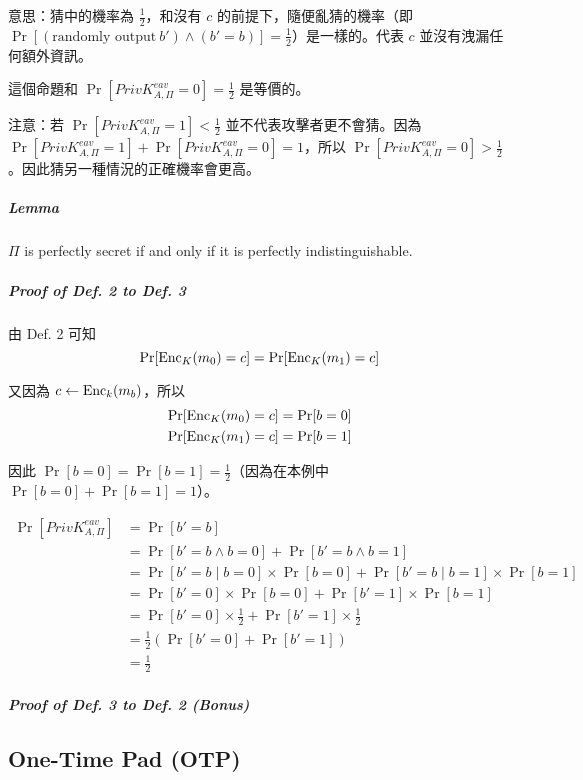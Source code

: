 意思：猜中的機率為 \(\frac{1}{2}\)，和沒有 \(c\) 的前提下，隨便亂猜的機率（即 \(\Pr[(\text{randomly output} \ b' ) \wedge (b' = b)] = \frac{1}{2}\)）是一樣的。代表 \(c\) 並沒有洩漏任何額外資訊。

這個命題和 \(\Pr[PrivK_{A, \Pi}^{eav} = 0] = \frac{1}{2}\) 是等價的。

注意：若 \(\Pr[PrivK_{A, \Pi}^{eav} = 1] < \frac{1}{2}\) 並不代表攻擊者更不會猜。因為 \(\Pr[PrivK_{A, \Pi}^{eav} = 1] + \Pr[PrivK_{A, \Pi}^{eav} = 0] = 1\)，所以 \(\Pr[PrivK_{A, \Pi}^{eav} = 0] > \frac{1}{2}\)。因此猜另一種情況的正確機率會更高。

\subparagraph{Lemma}

\(\Pi\) is perfectly secret if and only if it is perfectly indistinguishable.

\subparagraph{Proof of Def. 2 to Def. 3}

由 Def. 2 可知
\[
	\Pr[\operatorname{Enc}_K(m_0) = c] = \Pr[\operatorname{Enc}_K(m_1) = c]
\]

又因為 \(c \leftarrow \operatorname{Enc}_k(m_b)\)，所以
\begin{align*}
	\Pr[\operatorname{Enc}_K(m_0) = c] = \Pr[b = 0] \\
	\Pr[\operatorname{Enc}_K(m_1) = c] = \Pr[b = 1]
\end{align*}

因此 \(\Pr[b = 0] = \Pr[b = 1] = \displaystyle\frac{1}{2}\)（因為在本例中 \(\Pr[b = 0] + \Pr[b = 1] = 1\)）。

\begin{align*}
	\Pr[PrivK_{A, \Pi}^{eav}] &= \Pr[b' = b] \\
	&= \Pr[b' = b \wedge b = 0] + \Pr[b' = b \wedge b = 1] \tag{rewrite} \\
	&= \Pr[b' = b \mid b = 0] \times \Pr[b = 0] + \Pr[b' = b \mid b = 1] \times \Pr[b = 1] \tag{rewrite} \\
	&= \Pr[b' = 0]  \times \Pr[b = 0] + \Pr[b' = 1] \times \Pr[b = 1] \tag{rewrite} \\
	&= \Pr[b' = 0]  \times \frac{1}{2} + \Pr[b' = 1] \times \frac{1}{2} \tag{by Def. 2 denoted above} \\
	&= \frac{1}{2}(\Pr[b' = 0] + \Pr[b' = 1]) \\
	&= \frac{1}{2}	\tag{\(\because \Pr[b' = 0] + \Pr[b' = 1] = 1\)}
\end{align*}

\subparagraph{Proof of Def. 3 to Def. 2 (Bonus)}



\subsection{One-Time Pad (OTP)}

